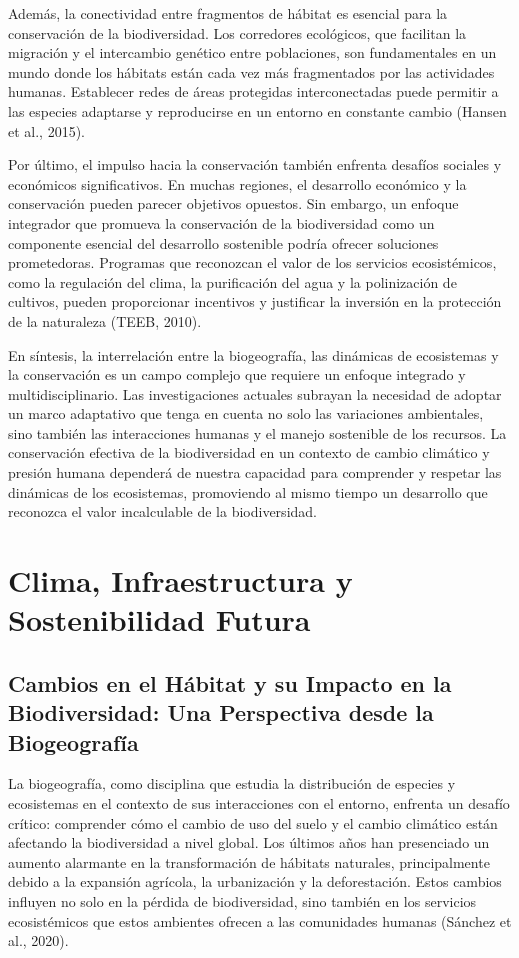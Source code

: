 \documentclass[
  letterpaper,
  DIV=11,
  numbers=noendperiod,
  oneside]{scrreprt}
\begin{document}
Además, la conectividad entre fragmentos de hábitat es esencial para la
conservación de la biodiversidad. Los corredores ecológicos, que
facilitan la migración y el intercambio genético entre poblaciones, son
fundamentales en un mundo donde los hábitats están cada vez más
fragmentados por las actividades humanas. Establecer redes de áreas
protegidas interconectadas puede permitir a las especies adaptarse y
reproducirse en un entorno en constante cambio (Hansen et al., 2015).

Por último, el impulso hacia la conservación también enfrenta desafíos
sociales y económicos significativos. En muchas regiones, el desarrollo
económico y la conservación pueden parecer objetivos opuestos. Sin
embargo, un enfoque integrador que promueva la conservación de la
biodiversidad como un componente esencial del desarrollo sostenible
podría ofrecer soluciones prometedoras. Programas que reconozcan el
valor de los servicios ecosistémicos, como la regulación del clima, la
purificación del agua y la polinización de cultivos, pueden proporcionar
incentivos y justificar la inversión en la protección de la naturaleza
(TEEB, 2010).

En síntesis, la interrelación entre la biogeografía, las dinámicas de
ecosistemas y la conservación es un campo complejo que requiere un
enfoque integrado y multidisciplinario. Las investigaciones actuales
subrayan la necesidad de adoptar un marco adaptativo que tenga en cuenta
no solo las variaciones ambientales, sino también las interacciones
humanas y el manejo sostenible de los recursos. La conservación efectiva
de la biodiversidad en un contexto de cambio climático y presión humana
dependerá de nuestra capacidad para comprender y respetar las dinámicas
de los ecosistemas, promoviendo al mismo tiempo un desarrollo que
reconozca el valor incalculable de la biodiversidad.

\part{Clima, Infraestructura y Sostenibilidad Futura}

\chapter{Cambios en el Hábitat y su Impacto en la Biodiversidad: Una
Perspectiva desde la
Biogeografía}\label{cambios-en-el-huxe1bitat-y-su-impacto-en-la-biodiversidad-una-perspectiva-desde-la-biogeografuxeda}

La biogeografía, como disciplina que estudia la distribución de especies
y ecosistemas en el contexto de sus interacciones con el entorno,
enfrenta un desafío crítico: comprender cómo el cambio de uso del suelo
y el cambio climático están afectando la biodiversidad a nivel global.
Los últimos años han presenciado un aumento alarmante en la
transformación de hábitats naturales, principalmente debido a la
expansión agrícola, la urbanización y la deforestación. Estos cambios
influyen no solo en la pérdida de biodiversidad, sino también en los
servicios ecosistémicos que estos ambientes ofrecen a las comunidades
humanas (Sánchez et al., 2020).
\end{document}
